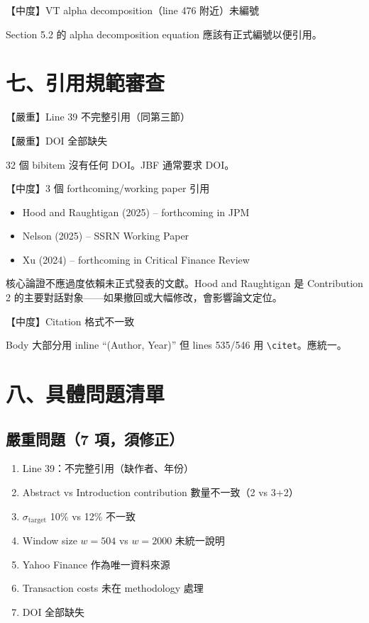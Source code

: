 \documentclass[12pt,a4paper]{article}
\begin{document}
\textcolor{warncolor}{【中度】VT alpha decomposition（line 476 附近）未編號}

Section 5.2 的 alpha decomposition equation 應該有正式編號以便引用。

\section*{七、引用規範審查}

\textcolor{errorred}{【嚴重】Line 39 不完整引用}（同第三節）

\textcolor{errorred}{【嚴重】DOI 全部缺失}

32 個 bibitem 沒有任何 DOI。JBF 通常要求 DOI。

\bigskip
\textcolor{warncolor}{【中度】3 個 forthcoming/working paper 引用}

\begin{itemize}[nosep]
\item Hood and Raughtigan (2025) -- forthcoming in JPM
\item Nelson (2025) -- SSRN Working Paper
\item Xu (2024) -- forthcoming in Critical Finance Review
\end{itemize}

核心論證不應過度依賴未正式發表的文獻。Hood and Raughtigan 是 Contribution 2 的主要對話對象——如果撤回或大幅修改，會影響論文定位。

\bigskip
\textcolor{warncolor}{【中度】Citation 格式不一致}

Body 大部分用 inline ``(Author, Year)'' 但 lines 535/546 用 \texttt{\textbackslash citet}。應統一。

\section*{八、具體問題清單}

\subsection*{\textcolor{errorred}{嚴重問題（7 項，須修正）}}
\begin{enumerate}[nosep]
\item Line 39：不完整引用（缺作者、年份）
\item Abstract vs Introduction contribution 數量不一致（2 vs 3+2）
\item $\sigma_{\text{target}}$ 10\% vs 12\% 不一致
\item Window size $w = 504$ vs $w = 2000$ 未統一說明
\item Yahoo Finance 作為唯一資料來源
\item Transaction costs 未在 methodology 處理
\item DOI 全部缺失
\end{enumerate}
\end{document}
